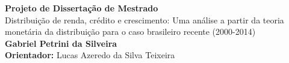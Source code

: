 \documentclass[
12pt,				%
openright,			%
oneside,			%
a4paper,		%
brazil,				%
]{article}
\begin{document}
\begin{center}
	\textbf{Projeto de Dissertação de Mestrado}\\
	Distribuição de renda, crédito e crescimento: 
	Uma análise a partir da teoria monetária da distribuição 
	para o caso brasileiro recente (2000-2014)\\
	\textbf{Gabriel Petrini da Silveira}\\
	\textbf{Orientador:} Lucas Azeredo da Silva Teixeira
\end{center}
\begin{comment}
Habilitar caso seja necessário um abstract em outra página

\Abstract{
teste in english
}
\end{comment}

\sectionfont{\scshape}
\end{document}
